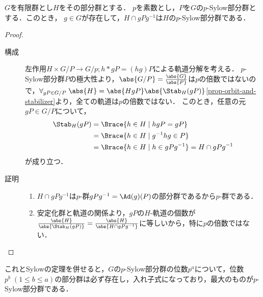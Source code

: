 \documentclass[uplatex,dvipdfmx]{jsreport}
\begin{document}
\begin{lemma}\label{lemma-p-Sylow-subgroup-of-subgroup}
    $G$を有限群とし$H$をその部分群とする．
    $p$を素数とし，$P$を$G$の$p$-Sylow部分群とする．このとき，
    $g\in G$が存在して，$H\cap gPg^{-1}$は$H$の$p$-Sylow部分群である．
\end{lemma}
\begin{proof}\mbox{}
    \begin{description}
        \item[構成] 左作用$H\times G/P\to G/p;h*gP=(hg)P$による軌道分解を考える．
        $p$-Sylow部分群$P$の極大性より，$\abs{G/P}=\frac{\abs{G}}{\abs{P}}$は$p$の倍数ではないので，$\forall_{gP\in G/P}\;\abs{H}=\abs{HgP}\abs{\Stab_H(gP)}$\ref{prop-orbit-and-stabilizer}より，全ての軌道は$p$の倍数ではない．
        このとき，任意の元$gP\in G/P$について，
        \begin{align*}
            \Stab_H(gP)&=\Brace{h\in H\mid hgP=gP}\\
            &=\Brace{h\in H\mid g^{-1}hg\in P}\\
            &=\Brace{h\in H\mid h\in gPg^{-1}}=H\cap gPg^{-1}
        \end{align*}
        が成り立つ．
        \item[証明]
        \begin{enumerate}
            \item $H\cap gPg^{-1}$は$p$-群$gPg^{-1}=\Ad(g)(P)$の部分群であるから$p$-群である．
            \item 安定化群と軌道の関係より，$gP$の$H$-軌道の個数が$\frac{\abs{H}}{\abs{\Stab_H(gP)}}=\frac{\abs{H}}{\abs{H\cap gPg^{-1}}}$に等しいから，特に$p$の倍数ではない．
        \end{enumerate}
    \end{description}
\end{proof}
\begin{remarks}
    これとSylowの定理を併せると，$G$の$p$-Sylow部分群の位数$p^a$について，位数$p^b\;(1\le b\le a)$の部分群は必ず存在し，入れ子式になっており，最大のものが$p$-Sylow部分群である．
\end{remarks}
\end{document}
